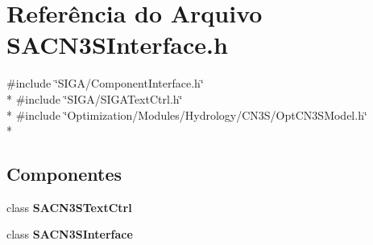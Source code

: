 \section{Referência do Arquivo S\+A\+C\+N3\+S\+Interface.\+h}
\label{_s_a_c_n3_s_interface_8h}
{\ttfamily \#include \char`\"{}S\+I\+G\+A/\+Component\+Interface.\+h\char`\"{}}\\*
{\ttfamily \#include \char`\"{}S\+I\+G\+A/\+S\+I\+G\+A\+Text\+Ctrl.\+h\char`\"{}}\\*
{\ttfamily \#include \char`\"{}Optimization/\+Modules/\+Hydrology/\+C\+N3\+S/\+Opt\+C\+N3\+S\+Model.\+h\char`\"{}}\\*
\subsection*{Componentes}
\begin{DoxyCompactItemize}
\item 
class {\bf S\+A\+C\+N3\+S\+Text\+Ctrl}
\item 
class {\bf S\+A\+C\+N3\+S\+Interface}
\end{DoxyCompactItemize}
